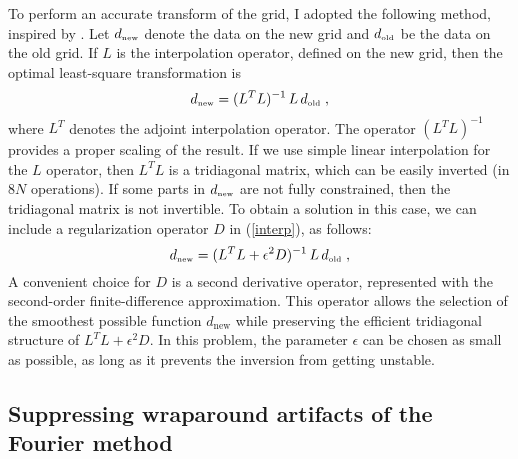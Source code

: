 To perform an accurate transform of the grid, I adopted the following
method, inspired by \cite[]{Claerbout.sep.48.347}. Let $d_{\mbox{\tiny
    new}}$ denote the data on the new grid and $d_{\mbox{\tiny old}}$
be the data on the old grid. If $L$ is the interpolation operator,
defined on the new grid, then the optimal least-square transformation
is
\begin{equation}
  \label{interp}
  d_{\mbox{\tiny new}} = (L^T L)^{-1}\,L\,d_{\mbox{\tiny old}}\;,
\end{equation}
where $L^T$ denotes the adjoint interpolation operator. The operator
$(L^T L)^{-1}$ provides a proper scaling of the result. If we use
simple linear interpolation for the $L$ operator, then $L^T L$ is a
tridiagonal matrix, which can be easily inverted (in $8 N$
operations). If some parts in $d_{\mbox{\tiny new}}$ are not fully
constrained, then the tridiagonal matrix is not invertible. To obtain
a solution in this case, we can include a regularization operator $D$
in (\ref{interp}), as follows:
\begin{equation}
  \label{regul}
  d_{\mbox{\tiny new}} = (L^T L + \epsilon^2 D)^{-1}\,L\,d_{\mbox{\tiny
      old}}\;,
\end{equation}
A convenient choice for $D$ is a second derivative operator,
represented with the second-order finite-difference approximation.
This operator allows the selection of the smoothest possible function
$d_{\mbox{new}}$ while preserving the efficient tridiagonal structure
of $L^T L + \epsilon^2 D$. In this problem, the parameter $\epsilon$
can be chosen as small as possible, as long as it prevents the
inversion from getting unstable.
\par
\subsection{Suppressing wraparound artifacts of the Fourier method}

